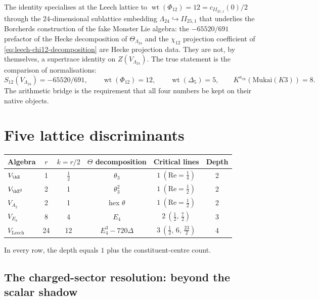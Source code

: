 \begin{remark}
The identity specialises at the Leech lattice to
$\operatorname{wt}(\Phi_{12})=12=c_{II_{25,1}}(0)/2$ through the
$24$-dimensional sublattice embedding
$\Lambda_{24} \hookrightarrow II_{25,1}$ that underlies the
Borcherds construction of the fake Monster Lie algebra: the
$-65520/691$ prefactor of the Hecke decomposition of
$\Theta_{\Lambda_{24}}$ and the $\chi_{12}$ projection coefficient of
\eqref{eq:leech-chi12-decomposition} are Hecke projection data.
They are not, by themselves, a supertrace identity on
$Z(V_{\Lambda_{24}})$. The true statement is the comparison of
normalisations:
\[
 S_{12}(V_{\Lambda_{24}})=-65520/691,\qquad
 \operatorname{wt}(\Phi_{12})=12,\qquad
 \operatorname{wt}(\Delta_5)=5,\qquad
 K^{\kappa_{\mathrm{ch}}}(\mathrm{Mukai}(K3))=8.
\]
The arithmetic bridge is the requirement that all four numbers be
kept on their native objects.
\end{remark}

\section{Five lattice discriminants}
\label{sec:five-lattice-verifications}

\begin{center}
\renewcommand{\arraystretch}{1.3}
\begin{tabular}{lccccc}
\hline
\textbf{Algebra} & $r$ & $k{=}r/2$ & $\Theta$ decomposition
 & \textbf{Critical lines} & \textbf{Depth}\\
\hline
$V_{\bZ}$ & 1 & $\tfrac12$ & $\theta_3$
 & $1\ (\mathrm{Re}=\tfrac14)$ & 2\\
$V_{\bZ^2}$ & 2 & 1 & $\theta_3^2$
 & $1\ (\mathrm{Re}=\tfrac12)$ & 2\\
$V_{A_2}$ & 2 & 1 & hex $\theta$
 & $1\ (\mathrm{Re}=\tfrac12)$ & 2\\
$V_{E_8}$ & 8 & 4 & $E_4$
 & $2\ (\tfrac12,\,\tfrac72)$ & 3\\
$V_{\mathrm{Leech}}$ & 24 & 12 & $E_4^3-720\Delta$
 & $3\ (\tfrac12,\,6,\,\tfrac{23}{2})$ & 4\\
\hline
\end{tabular}
\end{center}

In every row, the depth equals $1$ plus the constituent-centre count.

\subsection{The charged-sector resolution: beyond the scalar shadow}
\label{sec:charged-sector-resolution}


